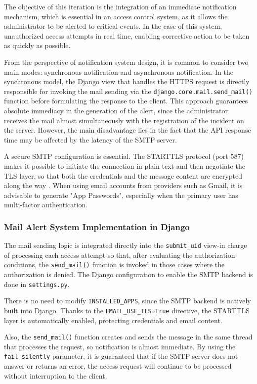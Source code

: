 The objective of this iteration is the integration of an immediate notification mechanism, which is essential in an access control system, as it allows the administrator to be alerted to critical events. In the case of this system, unauthorized access attempts in real time, enabling corrective action to be taken as quickly as possible.

From the perspective of notification system design, it is common to consider two main modes: synchronous notification and asynchronous notification. In the synchronous model, the Django view that handles the HTTPS request is directly responsible for invoking the mail sending via the \texttt{django.core.mail.send\_mail()} function before formulating the response to the client. This approach guarantees absolute immediacy in the generation of the alert, since the administrator receives the mail almost simultaneously with the registration of the incident on the server. However, the main disadvantage lies in the fact that the API response time may be affected by the latency of the SMTP server.

A secure SMTP configuration is essential. The STARTTLS protocol (port 587) makes it possible to initiate the connection in plain text and then negotiate the TLS layer, so that both the credentials and the message content are encrypted along the way \cite{Ref78}. When using email accounts from providers such as Gmail, it is advisable to generate "App Passwords", especially when the primary user has multi-factor authentication.

\subsubsection{Mail Alert System Implementation in Django}

The mail sending logic is integrated directly into the \texttt{submit\_uid} view-in charge of processing each access attempt-so that, after evaluating the authorization conditions, the \texttt{send\_mail()} function is invoked in those cases where the authorization is denied. The Django configuration to enable the SMTP backend is done in \texttt{settings.py}.

There is no need to modify \texttt{INSTALLED\_APPS}, since the SMTP backend is natively built into Django. Thanks to the \texttt{EMAIL\_USE\_TLS=True} directive, the STARTTLS layer is automatically enabled, protecting credentials and email content.

Also, the \texttt{send\_mail()} function creates and sends the message in the same thread that processes the request, so notification is almost immediate. By using the \texttt{fail\_silently} parameter, it is guaranteed that if the SMTP server does not answer or returns an error, the access request will continue to be processed without interruption to the client.

